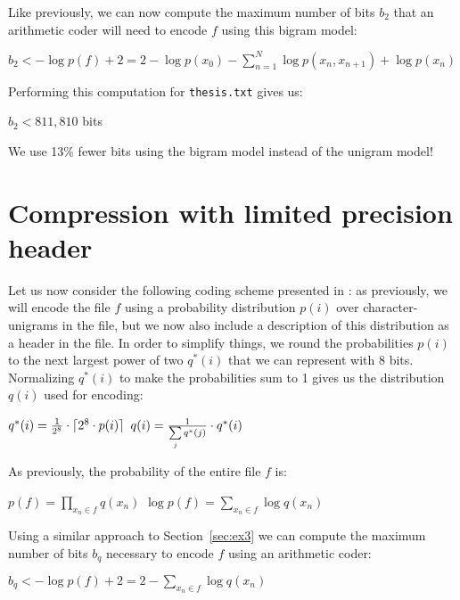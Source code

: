 \documentclass[10pt,a4paper,oneside,onecolumn]{article}
\DeclarePairedDelimiter{\ceil}{\lceil}{\rceil}
\newcommand*{\thesisTXT}{{\tt thesis.txt}\xspace}
\begin{document}
Like previously, we can now compute the maximum number of bits $b_2$ that an
arithmetic coder will need to encode $f$ using this bigram model:

\begin{center}
    $b_2 < -\log p(f) + 2
    = 2 - \log p(x_0) - \sum\limits_{n = 1}^{N} \log p(x_n, x_{n + 1}) + \log p(x_n)$
\end{center}

Performing this computation for \thesisTXT gives us:

\begin{center}
    $b_2 < 811,810$ bits
\end{center}

We use 13\% fewer bits using the bigram model instead of the unigram model!


\section{Compression with limited precision header}\label{sec:ex4}

Let us now consider the following coding scheme presented in \cite{it-assign}:
as previously, we will encode the file $f$ using a probability distribution
$p(i)$ over character-unigrams in the file, but we now also include a description
of this distribution as a header in the file. In order to simplify things, we
round the probabilities $p(i)$ to the next largest power of two $q^*(i)$ that we
can represent with 8 bits. Normalizing $q^*(i)$ to make the probabilities sum to
1 gives us the distribution $q(i)$ used for encoding:

\begin{center}
    $q^*(i) = {1 \over 2^8} \cdot \ceil{2^8 \cdot p(i)}$
    $q(i) = {1 \over \sum\limits_{j} q^*(j)} \cdot q^*(i)$
\end{center}

As previously, the probability of the entire file $f$ is:

\begin{center}
    $p(f) = \prod\limits_{x_n \in f} q(x_n)$
    $\log p(f) = \sum\limits_{x_n \in f} \log q(x_n)$
\end{center}

Using a similar approach to Section~\ref{sec:ex3} we can compute the maximum
number of bits $b_q$ necessary to encode $f$ using an arithmetic coder:

\begin{center}
    $b_q < -\log p(f) + 2
    = 2 - \sum\limits_{x_n \in f} \log q(x_n)$
\end{center}
\end{document}
